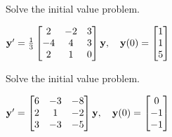 \documentclass{ximera}
\begin{document}
\begin{problem}\label{exer:10.4.21}
Solve the initial value problem.

$ {\bf y}'=\frac{1}{3} \begin{bmatrix}2&-2&3\\-4&4&3\\2&1&0\end{bmatrix}{\bf
y},\quad{\bf y}(0)= \begin{bmatrix}1\\1\\5\end{bmatrix}$
\end{problem}

\begin{problem}\label{exer:10.4.22}
Solve the initial value problem.

$ {\bf y}'= \begin{bmatrix}6&-3&-8\\2&1&-2\\3&-3&-5\end{bmatrix}{\bf
y},\quad{\bf y}(0)= \begin{bmatrix}0\\-1\\-1\end{bmatrix}$


\end{problem}
\end{document}
